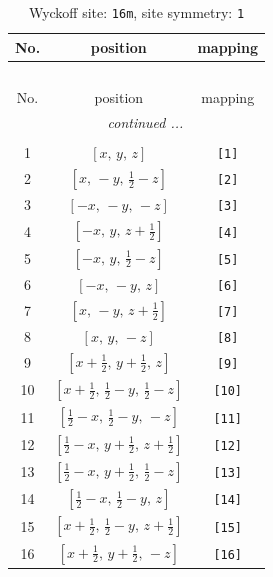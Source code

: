 \documentclass[fleqn,8pt]{jsarticle}
\begin{document}
\begin{longtable}{ccc}
\caption{Wyckoff site: {\tt 16m}, site symmetry: {\tt 1}}
 \\
 \hline \hline
No. & position & mapping \\ \hline \endfirsthead

\multicolumn{2}{l}{\tablename\ \thetable{}} \\
 \hline \hline
No. & position & mapping \\ \hline \endhead

 \hline \hline
\multicolumn{2}{r}{\footnotesize\it continued ...} \\ \endfoot

 \hline \hline
\multicolumn{2}{r}{} \\ \endlastfoot

1 & $\left[ x,\, y,\, z \right]$ & {\tt [1]} \\ \hline
2 & $\left[ x,\, - y,\, \frac{1}{2} - z \right]$ & {\tt [2]} \\ \hline
3 & $\left[ - x,\, - y,\, - z \right]$ & {\tt [3]} \\ \hline
4 & $\left[ - x,\, y,\, z + \frac{1}{2} \right]$ & {\tt [4]} \\ \hline
5 & $\left[ - x,\, y,\, \frac{1}{2} - z \right]$ & {\tt [5]} \\ \hline
6 & $\left[ - x,\, - y,\, z \right]$ & {\tt [6]} \\ \hline
7 & $\left[ x,\, - y,\, z + \frac{1}{2} \right]$ & {\tt [7]} \\ \hline
8 & $\left[ x,\, y,\, - z \right]$ & {\tt [8]} \\ \hline
9 & $\left[ x + \frac{1}{2},\, y + \frac{1}{2},\, z \right]$ & {\tt [9]} \\ \hline
10 & $\left[ x + \frac{1}{2},\, \frac{1}{2} - y,\, \frac{1}{2} - z \right]$ & {\tt [10]} \\ \hline
11 & $\left[ \frac{1}{2} - x,\, \frac{1}{2} - y,\, - z \right]$ & {\tt [11]} \\ \hline
12 & $\left[ \frac{1}{2} - x,\, y + \frac{1}{2},\, z + \frac{1}{2} \right]$ & {\tt [12]} \\ \hline
13 & $\left[ \frac{1}{2} - x,\, y + \frac{1}{2},\, \frac{1}{2} - z \right]$ & {\tt [13]} \\ \hline
14 & $\left[ \frac{1}{2} - x,\, \frac{1}{2} - y,\, z \right]$ & {\tt [14]} \\ \hline
15 & $\left[ x + \frac{1}{2},\, \frac{1}{2} - y,\, z + \frac{1}{2} \right]$ & {\tt [15]} \\ \hline
16 & $\left[ x + \frac{1}{2},\, y + \frac{1}{2},\, - z \right]$ & {\tt [16]} \\
\end{longtable}
\end{document}

